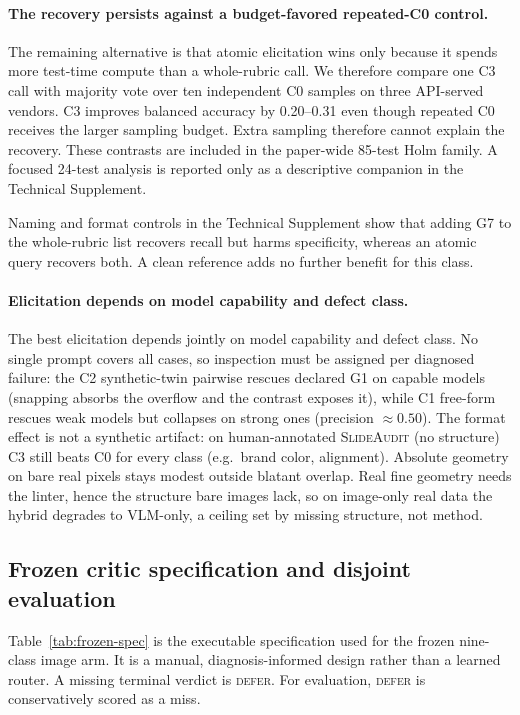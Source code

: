\documentclass[letterpaper]{article}            %
\newcommand{\g}[1]{\textsf{#1}}        %
\begin{document}
\paragraph{The recovery persists against a budget-favored repeated-C0 control.}
The remaining alternative is that atomic elicitation wins only because it spends more test-time compute than a
whole-rubric call. We therefore compare one C3 call with majority vote over ten independent C0 samples on three
API-served vendors. C3 improves balanced accuracy by 0.20--0.31 even though repeated C0 receives the larger
sampling budget. Extra sampling therefore cannot explain the recovery. These contrasts are included in the
paper-wide 85-test Holm family. A focused 24-test analysis is reported only as a descriptive companion in the
Technical Supplement.

Naming and format controls in the Technical Supplement show that adding \g{G7} to the whole-rubric list
recovers recall but harms specificity, whereas an atomic query recovers both. A clean reference adds no further
benefit for this class.

\paragraph{Elicitation depends on model capability and defect class.}
The best elicitation depends jointly on model capability and defect class. No single prompt covers all cases, so
inspection must be assigned per diagnosed failure: the C2 synthetic-twin pairwise rescues declared \g{G1} on capable
models (snapping absorbs the overflow and the contrast exposes it), while C1 free-form rescues weak models
but collapses on strong ones (precision $\approx0.50$). The format effect is not a synthetic artifact: on
human-annotated \textsc{SlideAudit} (no structure) C3 still beats C0 for every class (e.g.\ brand color,
alignment). Absolute geometry on bare real pixels stays modest outside blatant overlap. Real fine geometry
needs the linter, hence the structure bare images lack, so on image-only real data the hybrid degrades to
VLM-only, a ceiling set by missing structure, not method.

\subsection{Frozen critic specification and disjoint evaluation}\label{sec:coverage}

Table~\ref{tab:frozen-spec} is the executable specification used for the frozen nine-class image arm. It is a
manual, diagnosis-informed design rather than a learned router. A missing terminal verdict is \textsc{defer}.
For evaluation, \textsc{defer} is conservatively scored as a miss.
\end{document}
